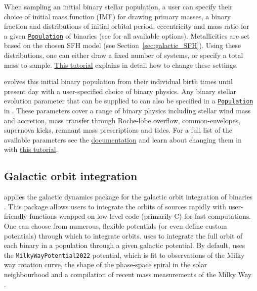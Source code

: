 \documentclass[twocolumn, twocolappendix, oneside, linenumbers]{aastex631}
\newcommand{\codeLink}[2]{{\href{https://cogsworth.readthedocs.io/en/latest/api/cogsworth.#2.#1.html}{\color{codecolour} \texttt{#1}}}}
\newcommand{\tutorialLink}[2]{\href{#1}{{\color{codecolour}#2}}}
\begin{document}
When sampling an initial binary stellar population, a user can specify their choice of initial mass function (IMF) for drawing primary masses, a binary fraction and distributions of initial orbital period, eccentricity and mass ratio for a given \codeLink{Population}{pop} of binaries (see \citealp[Section 2.1.1 of][]{COSMIC} for all available options). Metallicities are set based on the chosen SFH model (see Section~\ref{sec:galactic_SFH}). Using these distributions, one can either draw a fixed number of systems, or specify a total mass to sample. \tutorialLink{https://cogsworth.readthedocs.io/en/latest/tutorials/pop_settings/sampling.html}{This tutorial} explains in detail how to change these settings.

\cogsworth evolves this initial binary population from their individual birth times until present day with a user-specified choice of binary physics. Any binary stellar evolution parameter that can be supplied to \cosmic can also be specified in a \codeLink{Population}{pop} in \cogsworth. These parameters cover a range of binary physics including stellar wind mass and accretion, mass transfer through Roche-lobe overflow, common-envelopes, supernova kicks, remnant mass prescriptions and tides. For a full list of the available parameters see the \href{https://cosmic-popsynth.github.io}{\cosmic documentation} and learn about changing them in \cogsworth with \tutorialLink{https://cogsworth.readthedocs.io/en/latest/tutorials/pop_settings/pop_synth.html}{this tutorial}.

\subsection{Galactic orbit integration}\label{sec:orbit_integration}

\cogsworth applies the galactic dynamics package \gala{} for the galactic orbit integration of binaries \citep{Gala}. This package allows users to integrate the orbits of sources rapidly with user-friendly functions wrapped on low-level code (primarily C) for fast computations. One can choose from numerous, flexible potentials (or even define custom potentials) through which to integrate orbits. \cogsworth uses \gala to integrate the full orbit of each binary in a population through a given galactic potential. By default, \cogsworth uses the \texttt{MilkyWayPotential2022} potential, which is fit to observations of the Milky way rotation curve, the shape of the phase-space spiral in the solar neighbourhood and a compilation of recent mass measurements of the Milky Way \citep{Eilers+2019:2019ApJ...871..120E, Darragh-Ford+2023:2023ApJ...955...74D}.
\end{document}
